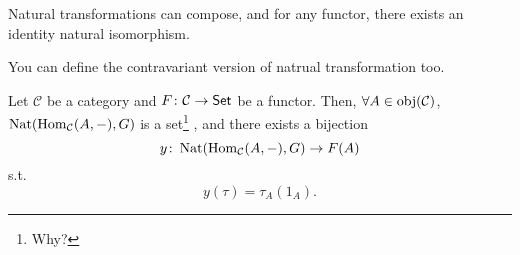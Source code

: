\documentclass[openany, a5paper]{book}
\begin{document}
Natural transformations can compose, and for any functor, there exists an identity natural isomorphism.

You can define the contravariant version of natrual transformation too.

\begin{theorem}%
	\label{theorem: Yoneda lemma}
	Let $\mathcal C$ be a category and $F \colon \mathcal C \to \operatorname{\mathsf{Set}}$ be a functor.
	Then, $\forall A \in \operatorname{obj}(\mathcal C)$, $\operatorname{Nat}(\operatorname{Hom}_{\mathcal C}(A, -), G)$ is a set\footnote{Why?}%
	, and there exists a bijection
	\begin{equation}
		y \colon \operatorname{Nat}(\operatorname{Hom}_{\mathcal C}(A, -), G) \to F(A)
	\end{equation}
	s.t.\ 
	\begin{equation}
		y(\tau) = \tau_A (1_A).
	\end{equation}
\end{theorem}
\end{document}
